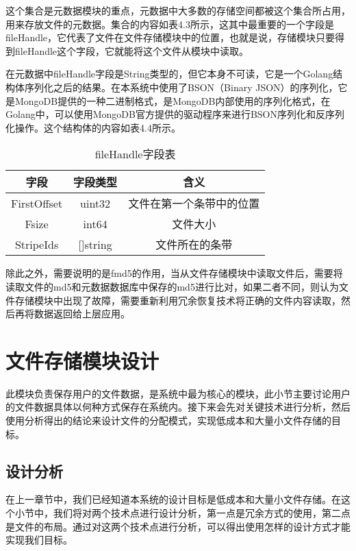 这个集合是元数据模块的重点，元数据中大多数的存储空间都被这个集合所占用，用来存放文件的元数据。集合的内容如表4.3所示，这其中最重要的一个字段是fileHandle，它代表了文件在文件存储模块中的位置，也就是说，存储模块只要得到fileHandle这个字段，它就能将这个文件从模块中读取。

在元数据中fileHandle字段是String类型的，但它本身不可读，它是一个Golang结构体序列化之后的结果。在本系统中使用了BSON（Binary JSON）的序列化，它是MongoDB提供的一种二进制格式，是MongoDB内部使用的序列化格式，在Golang中，可以使用MongoDB官方提供的驱动程序来进行BSON序列化和反序列化操作。这个结构体的内容如表4.4所示。

\begin{table}[h]
  \centering
  \caption{fileHandle字段表}
  \begin{tabular}{ccc}
    \toprule
    字段   & 字段类型   & 含义                          \\
    \midrule
    FirstOffset & uint32     & 文件在第一个条带中的位置                 \\
    Fsize       & int64      & 文件大小                \\
    StripeIds   & []string   & 文件所在的条带         \\
    \bottomrule
  \end{tabular}
\end{table}

除此之外，需要说明的是fmd5的作用，当从文件存储模块中读取文件后，需要将读取文件的md5和元数据数据库中保存的md5进行比对，如果二者不同，则认为文件存储模块中出现了故障，需要重新利用冗余恢复技术将正确的文件内容读取，然后再将数据返回给上层应用。

\section{文件存储模块设计}
此模块负责保存用户的文件数据，是系统中最为核心的模块，此小节主要讨论用户的文件数据具体以何种方式保存在系统内。接下来会先对关键技术进行分析，然后使用分析得出的结论来设计文件的分配模式，实现低成本和大量小文件存储的目标。

\subsection{设计分析}
在上一章节中，我们已经知道本系统的设计目标是低成本和大量小文件存储。在这个小节中，我们将对两个技术点进行设计分析，第一点是冗余方式的使用，第二点是文件的布局。通过对这两个技术点进行分析，可以得出使用怎样的设计方式才能实现我们目标。


